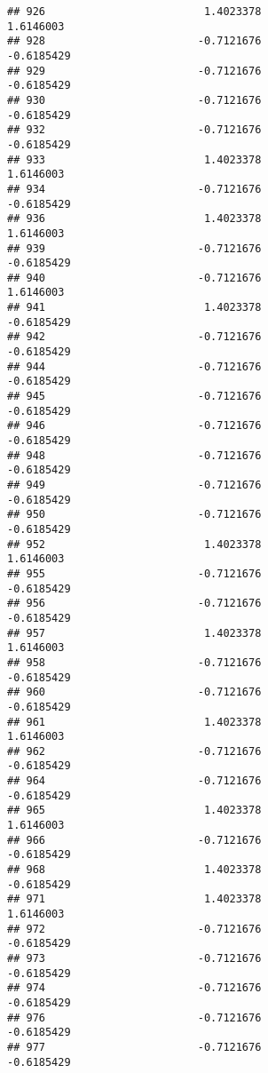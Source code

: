 \documentclass[
]{article}
\begin{document}
\begin{verbatim}
## 926                         1.4023378                        1.6146003
## 928                        -0.7121676                       -0.6185429
## 929                        -0.7121676                       -0.6185429
## 930                        -0.7121676                       -0.6185429
## 932                        -0.7121676                       -0.6185429
## 933                         1.4023378                        1.6146003
## 934                        -0.7121676                       -0.6185429
## 936                         1.4023378                        1.6146003
## 939                        -0.7121676                       -0.6185429
## 940                        -0.7121676                        1.6146003
## 941                         1.4023378                       -0.6185429
## 942                        -0.7121676                       -0.6185429
## 944                        -0.7121676                       -0.6185429
## 945                        -0.7121676                       -0.6185429
## 946                        -0.7121676                       -0.6185429
## 948                        -0.7121676                       -0.6185429
## 949                        -0.7121676                       -0.6185429
## 950                        -0.7121676                       -0.6185429
## 952                         1.4023378                        1.6146003
## 955                        -0.7121676                       -0.6185429
## 956                        -0.7121676                       -0.6185429
## 957                         1.4023378                        1.6146003
## 958                        -0.7121676                       -0.6185429
## 960                        -0.7121676                       -0.6185429
## 961                         1.4023378                        1.6146003
## 962                        -0.7121676                       -0.6185429
## 964                        -0.7121676                       -0.6185429
## 965                         1.4023378                        1.6146003
## 966                        -0.7121676                       -0.6185429
## 968                         1.4023378                       -0.6185429
## 971                         1.4023378                        1.6146003
## 972                        -0.7121676                       -0.6185429
## 973                        -0.7121676                       -0.6185429
## 974                        -0.7121676                       -0.6185429
## 976                        -0.7121676                       -0.6185429
## 977                        -0.7121676                       -0.6185429

\end{verbatim}
\end{document}

